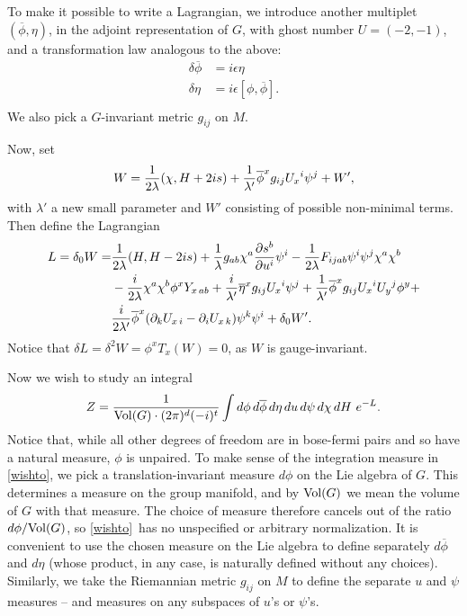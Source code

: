 \documentclass[12pt]{article}
\numberwithin{equation}{section}
\def\bar{\overline}
\begin{document}
To make it possible to write a Lagrangian, we introduce another multiplet
$(\bar \phi,\eta)$, in the adjoint representation of $G$, with
ghost number $U=(-2,-1)$, and a transformation law analogous to the above:
\begin{equation}
  \label{nurmo}
  \begin{aligned}\delta \bar\phi & = i\epsilon \eta\\ \delta\eta & =
    i\epsilon[\phi,\bar\phi].\\
  \end{aligned}
\end{equation}
We also pick a $G$-invariant metric $g_{ij}$ on $M$.

Now, set
\begin{equation}
  \label{neww}
  W={1\over 2\lambda}(\chi,H+2is) +{1\over \lambda'}
  \bar\phi^xg_{ij}U_x{}^i\psi^j +W',
\end{equation}
with $\lambda'$ a new small parameter and
$W'$ consisting of possible non-minimal terms.
Then define the Lagrangian
\begin{equation}
  \label{newl}
  \begin{aligned} L=\delta_0 W = &{1\over 2\lambda }(H,H-2is)+{1\over
    \lambda}g_{ab} \chi^a {\partial s^b \over \partial u^i}\psi^i
    -{1\over 2\lambda}F_{ijab}\psi^i\psi^j\chi^a\chi^b\\ &-{i\over
    2\lambda}\chi^a\chi^b\phi^xY_{x\,ab}
    +{i\over\lambda'}\bar\eta^xg_{ij}
    U_x{}^i\psi^j+{1\over\lambda'}\bar\phi^x
    g_{ij}U_x{}^iU_y{}^j\phi^y+\\ &{i\over
    2\lambda'}\bar\phi^x(\partial_kU_{x\,i}
    -\partial_iU_{x\,k})\psi^k\psi^i+\delta_0 W'.\\
  \end{aligned}
\end{equation}
Notice that $\delta L = \delta^2 W= \phi^xT_x(W)=0$, as $W$ is gauge-invariant.

Now we wish to study an integral
\begin{equation}
  \label{wishto}
  Z={1\over {\rm Vol}(G)\cdot (2\pi)^d(-i)^t} \int d\phi\,
  d\bar\phi\,d\eta \,du\,d\psi\,d\chi\,dH \,\,e^{-L}.
\end{equation}
Notice that, while all other degrees of freedom are in bose-fermi
pairs and so have a natural measure, $\phi$ is unpaired.  To make
sense of the integration measure in \eqref{wishto}, we pick a
translation-invariant
measure $d\phi$ on the Lie algebra of $G$.  This determines a measure
on the group manifold, and by ${\rm Vol}(G)$ we mean the volume of $G$
with that measure.  The choice of measure therefore cancels out of
the ratio $d\phi/{\rm Vol}(G)$, so \eqref{wishto}\ has no unspecified
or arbitrary
normalization.  It is convenient to use the chosen measure on the Lie
algebra to define separately $d\bar\phi$ and $d\eta$ (whose product, in any
case, is naturally defined without any choices).  Similarly, we take the
Riemannian metric $g_{ij}$ on $M$ to define the separate
$u$ and $\psi$ measures
-- and measures on any subspaces of $u$'s or $\psi$'s.
\end{document}
